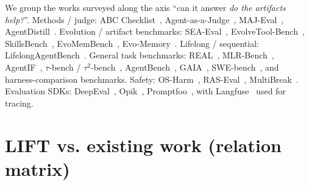\documentclass{article}
\begin{document}
We group the works surveyed along the axis ``can it answer \emph{do the artifacts help?}''. Methods / judge: ABC Checklist~\citep{zhu2025abc}, Agent-as-a-Judge~\citep{zhuge2024agentasajudge}, MAJ-Eval~\citep{chen2026majeval}, AgentDistill~\citep{qiu2025agentdistill}. Evolution / artifact benchmarks: SEA-Eval~\citep{jiang2026seaeval}, EvolveTool-Bench~\citep{kaliyev2026evolvetoolbench}, SkillsBench~\citep{li2026skillsbench}, EvoMemBench~\citep{wang2026evomembench}, Evo-Memory~\citep{wei2025evomemory}. Lifelong / sequential: LifelongAgentBench~\citep{zheng2025lifelongagentbench}. General task benchmarks: REAL~\citep{garg2025real}, MLR-Bench~\citep{chen2025mlrbench}, AgentIF~\citep{qi2025agentif}, $\tau$-bench / $\tau^2$-bench~\citep{yao2024taubench,barres2025tau2bench}, AgentBench~\citep{liu2023agentbench}, GAIA~\citep{mialon2023gaia}, SWE-bench~\citep{jimenez2024swebench}, and harness-comparison benchmarks. Safety: OS-Harm~\citep{kuntz2025osharm}, RAS-Eval~\citep{fu2025raseval}, MultiBreak~\citep{song2026multibreak}. Evaluation SDKs: DeepEval~\citep{confidentai_deepeval}, Opik~\citep{cometml_opik}, Promptfoo~\citep{promptfoo}, with Langfuse~\citep{langfuse} used for tracing.

\section{LIFT vs. existing work (relation matrix)}
\label{sec:relation-matrix}
\end{document}
